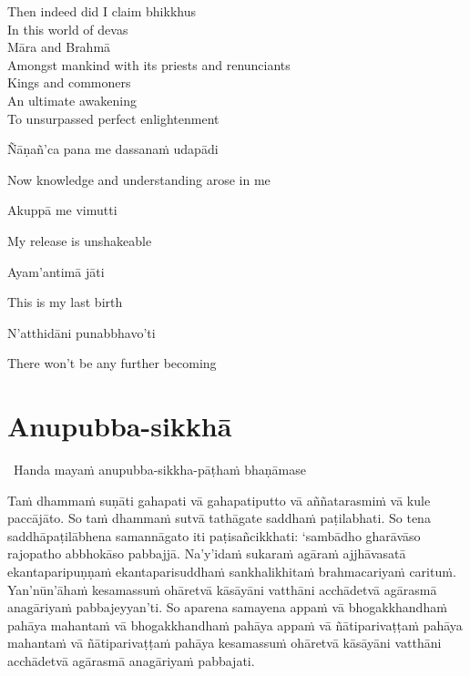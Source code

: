 \begin{english-verses}
  Then indeed did I claim bhikkhus\\
  In this world of devas\\
  Māra and Brahmā\\
  Amongst mankind with its priests and renunciants\\
  Kings and commoners\\
  An ultimate awakening\\
  To unsurpassed perfect enlightenment
\end{english-verses}

Ñāṇañ'ca pana me dassanaṁ udapādi

\begin{english}
  Now knowledge and understanding arose in me
\end{english}

Akuppā me vimutti

\begin{english}
  My release is unshakeable
\end{english}

Ayam'antimā jāti

\begin{english}
  This is my last birth
\end{english}

N'atthidāni punabbhavo'ti

\begin{english}
  There won't be any further becoming
\end{english}

\suttaRef{[SN 56.11]}


\section{Anupubba-sikkhā}

\begin{leader}
  \anglebracketleft\ \hspace{-0.5mm}Handa mayaṁ anupubba-sikkha-pāṭhaṁ bhaṇāmase \hspace{-0.5mm}\anglebracketright\
\end{leader}

Taṁ dhammaṁ suṇāti gahapati vā gahapatiputto vā aññatarasmiṁ vā kule paccājāto. So taṁ dhammaṁ sutvā tathāgate saddhaṁ paṭilabhati. So tena saddhāpaṭilābhena samannāgato iti paṭisañcikkhati: `sambādho gharāvāso rajopatho abbhokāso pabbajjā. Na'y'idaṁ sukaraṁ agāraṁ ajjhāvasatā ekantaparipuṇṇaṁ ekantaparisuddhaṁ sankhalikhitaṁ brahmacariyaṁ carituṁ. Yan'nūn'āhaṁ kesamassuṁ ohāretvā kāsāyāni vatthāni acchādetvā agārasmā anagāriyaṁ pabbajeyyan'ti. So aparena samayena appaṁ vā bhogakkhandhaṁ pahāya mahantaṁ vā bhogakkhandhaṁ pahāya appaṁ vā ñātiparivaṭṭaṁ pahāya mahantaṁ vā ñātiparivaṭṭaṁ pahāya kesamassuṁ ohāretvā kāsāyāni vatthāni acchādetvā agārasmā anagāriyaṁ pabbajati.

